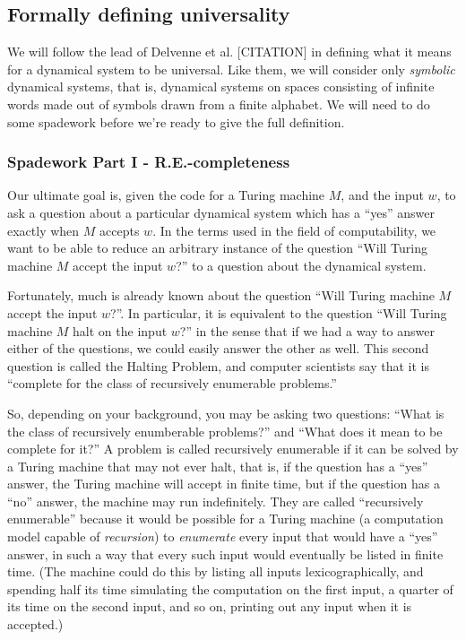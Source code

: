 \documentclass{fkpaper}
\begin{document}
\begin{multicols}{2}
\subsection*{Formally defining universality}

We will follow the lead of Delvenne et al. [CITATION] in defining what
it means for a dynamical system to be universal. Like them, we will
consider only {\it symbolic} dynamical systems, that is, dynamical
systems on spaces consisting of infinite words made out of symbols
drawn from a finite alphabet. We will need to do some spadework before
we're ready to give the full definition.

\subsubsection*{Spadework Part I - R.E.-completeness}

Our ultimate goal is, given the code for a Turing machine $M$, and the
input $w$, to ask a question about a particular dynamical system which
has a ``yes'' answer exactly when $M$ accepts $w$. In the terms used
in the field of computability, we want to be able to reduce an
arbitrary instance of the question ``Will Turing machine $M$ accept
the input $w$?'' to a question about the dynamical system.

Fortunately, much is already known about the question ``Will Turing
machine $M$ accept the input $w$?''. In particular, it is equivalent
to the question ``Will Turing machine $M$ halt on the input $w$?'' in
the sense that if we had a way to answer either of the questions, we
could easily answer the other as well. This second question is called
the Halting Problem, and computer scientists say that it is ``complete
for the class of recursively enumerable problems.''

So, depending on your background, you may be asking two questions:
``What is the class of recursively enumberable problems?'' and ``What
does it mean to be complete for it?'' A problem is called recursively
enumerable if it can be solved by a Turing machine that may not ever
halt, that is, if the question has a ``yes'' answer, the Turing
machine will accept in finite time, but if the question has a ``no''
answer, the machine may run indefinitely. They are called
``recursively enumerable'' because it would be possible for a Turing
machine (a computation model capable of {\it recursion}) to {\it
  enumerate} every input that would have a ``yes'' answer, in such a
way that every such input would eventually be listed in finite time.
(The machine could do this by listing all inputs lexicographically,
and spending half its time simulating the computation on the first
input, a quarter of its time on the second input, and so on, printing
out any input when it is accepted.)


\end{multicols}
\end{document}
